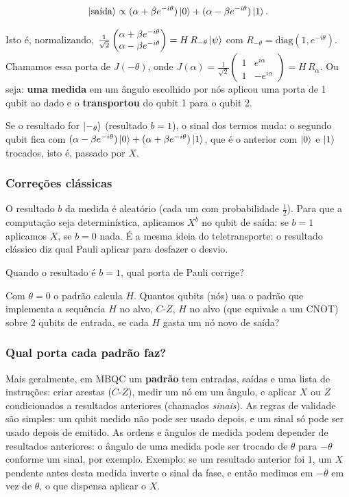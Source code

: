 \[
\left|{\text{saída}}\right> \propto (\alpha + \beta e^{-i\theta})\left|{0}\right> + (\alpha - \beta e^{-i\theta})\left|{1}\right>.
\]

Isto é, normalizando, \(\tfrac{1}{\sqrt2}\begin{pmatrix}\alpha+\beta e^{-i\theta}\\ \alpha-\beta e^{-i\theta}\end{pmatrix} = H\,R_{-\theta}\left|{\psi}\right>\) com \(R_{-\theta}=\mathrm{diag}(1,e^{-i\theta})\). Chamamos essa porta de \(J(-\theta)\), onde \(J(\alpha)=\tfrac{1}{\sqrt2}\begin{pmatrix}1&e^{i\alpha}\\1&-e^{i\alpha}\end{pmatrix}=H\,R_{\alpha}\). Ou seja: \textbf{uma medida} em um ângulo escolhido por nós aplicou uma porta de 1 qubit ao dado e o \textbf{transportou} do qubit 1 para o qubit 2.

Se o resultado for \(\left|{-_\theta}\right>\) (resultado \(b=1\)), o sinal dos termos muda: o segundo qubit fica com \((\alpha-\beta e^{-i\theta})\left|{0}\right>+(\alpha+\beta e^{-i\theta})\left|{1}\right>\), que é o anterior com \(\left|{0}\right>\) e \(\left|{1}\right>\) trocados, isto é, passado por \(X\).

\subsubsection{Correções clássicas}\label{correuxe7uxf5es-cluxe1ssicas}

O resultado \(b\) da medida é aleatório (cada um com probabilidade \(\tfrac12\)). Para que a computação seja determinística, aplicamos \(X^b\) no qubit de saída: se \(b=1\) aplicamos \(X\), se \(b=0\) nada. É a mesma ideia do teletransporte: o resultado clássico diz qual Pauli aplicar para desfazer o desvio.

Quando o resultado é \(b=1\), qual porta de Pauli corrige?

Com \(\theta = 0\) o padrão calcula \(H\). Quantos qubits (nós) usa o padrão que implementa a sequência \(H\) no alvo, \(C\text{-}Z\), \(H\) no alvo (que equivale a um CNOT) sobre 2 qubits de entrada, se cada \(H\) gasta um nó novo de saída?

\subsubsection{Qual porta cada padrão faz?}\label{qual-porta-cada-padruxe3o-faz}

Mais geralmente, em MBQC um \textbf{padrão} tem entradas, saídas e uma lista de instruções: criar arestas (\(C\text{-}Z\)), medir um nó em um ângulo, e aplicar \(X\) ou \(Z\) condicionados a resultados anteriores (chamados \emph{sinais}). As regras de validade são simples: um qubit medido não pode ser usado depois, e um sinal só pode ser usado depois de emitido. As ordens e ângulos de medida podem depender de resultados anteriores: o ângulo de uma medida pode ser trocado de \(\theta\) para \(-\theta\) conforme um sinal, por exemplo. Exemplo: se um resultado anterior foi \(1\), um \(X\) pendente antes desta medida inverte o sinal da fase, e então medimos em \(-\theta\) em vez de \(\theta\), o que dispensa aplicar o \(X\).

